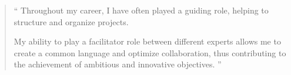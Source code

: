 \documentclass[10pt,a4paper,ragged2e,withhyper,normalphoto]{altacv}
\begin{document}


\makecvheader

\begin{quote}
``
Throughout my career, I have often played a guiding role, helping to structure and organize projects.

My ability to play a facilitator role between different experts allows me to create a common language and optimize collaboration, thus contributing to the achievement of ambitious and innovative objectives.
''
\end{quote}
\end{document}
